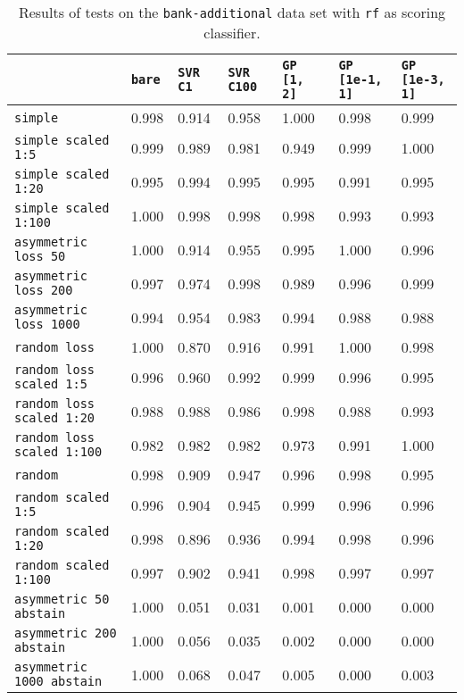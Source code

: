 \begin{table}
{\scriptsize
\begin{tabu}{l|l|l|l|l|l|l}
&\texttt{bare} &\texttt{SVR C1} &\texttt{SVR C100} &\texttt{GP [1, 2]} &\texttt{GP [1e-1, 1]} &\texttt{GP [1e-3, 1]}  \\
\hline
\texttt{simple} &0.998 &0.914 &0.958 &1.000 &0.998 &0.999 \\
\texttt{simple scaled 1:5} &0.999 &0.989 &0.981 &0.949 &0.999 &1.000 \\
\texttt{simple scaled 1:20} &0.995 &0.994 &0.995 &0.995 &0.991 &0.995 \\
\texttt{simple scaled 1:100} &1.000 &0.998 &0.998 &0.998 &0.993 &0.993 \\
\texttt{asymmetric loss 50} &1.000 &0.914 &0.955 &0.995 &1.000 &0.996 \\
\texttt{asymmetric loss 200} &0.997 &0.974 &0.998 &0.989 &0.996 &0.999 \\
\texttt{asymmetric loss 1000} &0.994 &0.954 &0.983 &0.994 &0.988 &0.988 \\
\texttt{random loss} &1.000 &0.870 &0.916 &0.991 &1.000 &0.998 \\
\texttt{random loss scaled 1:5} &0.996 &0.960 &0.992 &0.999 &0.996 &0.995 \\
\texttt{random loss scaled 1:20} &0.988 &0.988 &0.986 &0.998 &0.988 &0.993 \\
\texttt{random loss scaled 1:100} &0.982 &0.982 &0.982 &0.973 &0.991 &1.000 \\
\texttt{random} &0.998 &0.909 &0.947 &0.996 &0.998 &0.995 \\
\texttt{random scaled 1:5} &0.996 &0.904 &0.945 &0.999 &0.996 &0.996 \\
\texttt{random scaled 1:20} &0.998 &0.896 &0.936 &0.994 &0.998 &0.996 \\
\texttt{random scaled 1:100} &0.997 &0.902 &0.941 &0.998 &0.997 &0.997 \\
\texttt{asymmetric 50 abstain} &1.000 &0.051 &0.031 &0.001 &0.000 &0.000 \\
\texttt{asymmetric 200 abstain} &1.000 &0.056 &0.035 &0.002 &0.000 &0.000 \\
\texttt{asymmetric 1000 abstain} &1.000 &0.068 &0.047 &0.005 &0.000 &0.003 \\
\end{tabu} }
\caption{Results of tests on the \texttt{bank-additional} data set
         with \texttt{rf} as scoring classifier.}
\end{table}

